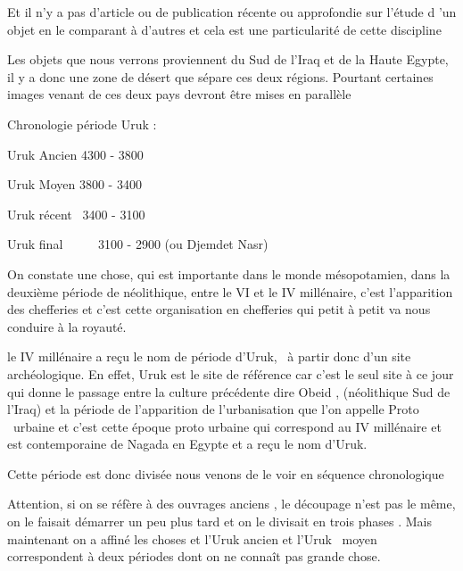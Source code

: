 \documentclass[a4paper]{article}
\begin{document}
{
Et il n'y a pas d'article ou de publication récente ou approfondie sur
l'étude d 'un objet en le comparant à d'autres et cela est une
particularité de cette discipline}


\bigskip

{
Les objets que nous verrons proviennent du Sud de l'Iraq et de la Haute
Egypte, il y a donc une zone de désert que sépare ces deux régions.
Pourtant certaines images venant de ces deux pays devront être mises en
parallèle}


\bigskip

{
Chronologie période Uruk : }

{
Uruk Ancien 4300 - 3800}

{
Uruk Moyen 3800 - 3400}

{
Uruk récent \ 3400 - 3100}

{
Uruk final \ \ \ \ \ 3100 - 2900 (ou Djemdet Nasr)}


\bigskip

{
On constate une chose, qui est importante dans le monde mésopotamien,
dans la deuxième période de néolithique, entre le VI et le IV
millénaire, c'est l'apparition des chefferies et c'est cette
organisation en chefferies qui petit à petit va nous conduire à la
royauté.}


\bigskip

{
le IV millénaire a reçu le nom de période d'Uruk, \ à partir donc d'un
site archéologique. En effet, Uruk est le site de référence car c'est
le seul site à ce jour qui donne le passage entre la culture précédente
dire Obeid , (néolithique Sud de l'Iraq) et la période de l'apparition
de l'urbanisation que l'on appelle Proto \ urbaine et c'est cette
époque proto urbaine qui correspond au IV millénaire et est
contemporaine de Nagada en Egypte et a reçu le nom d'Uruk.}


\bigskip

{
Cette période est donc divisée nous venons de le voir en séquence
chronologique}

{
Attention, si on se réfère à des ouvrages anciens , le découpage n'est
pas le même, on le faisait démarrer un peu plus tard et on le divisait
en trois phases . Mais maintenant on a affiné les choses et l'Uruk
ancien et l'Uruk \ moyen correspondent à deux périodes dont on ne
connaît pas grande chose.}
\end{document}
